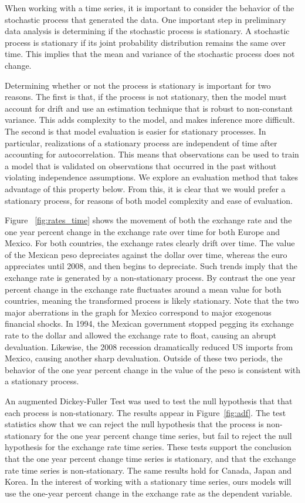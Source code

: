 \documentclass{sig-alternate-05-2015}
\begin{document}
When working with a time series, it is important to consider the behavior of the stochastic process that generated the data. One important step in preliminary data analysis is determining if the stochastic process is stationary. A stochastic process is stationary if its joint probability distribution remains the same over time. This implies that the mean and variance of the stochastic process does not change.
\par{} Determining whether or not the process is stationary is important for two reasons. The first is that, if the process is not stationary, then the model must account for drift and use an estimation technique that is robust to non-constant variance. This adds complexity to the model, and makes inference more difficult. The second is that model evaluation is easier for stationary processes. In particular, realizations of a stationary process are independent of time after accounting for autocorrelation. This means that observations can be used to train a model that is validated on observations that occurred in the past without violating independence assumptions. We explore an evaluation method that takes advantage of this property below. From this, it is clear that we would prefer a stationary process, for reasons of both model complexity and ease of evaluation.
\par{} Figure ~\ref{fig:rates_time} shows the movement of both the exchange rate and the one year percent change in the exchange rate over time for both Europe and Mexico. For both countries, the exchange rates clearly drift over time. The value of the Mexican peso depreciates against the dollar over time, whereas the euro appreciates until 2008, and then begins to depreciate. Such trends imply that the exchange rate is generated by a non-stationary process. By contrast the one year percent change in the exchange rate fluctuates around a mean value for both countries, meaning the transformed process is likely stationary. Note that the two major aberrations in the graph for Mexico correspond to major exogenous financial shocks. In 1994, the Mexican government stopped pegging its exchange rate to the dollar and allowed the exchange rate to float, causing an abrupt devaluation. Likewise, the 2008 recession dramatically reduced US imports from Mexico, causing another sharp devaluation. Outside of these two periods, the behavior of the one year percent change in the value of the peso is consistent with a stationary process.
\par{} An augmented Dickey-Fuller Test was used to test the null hypothesis that that each process is non-stationary. The results appear in Figure~\ref{fig:adf}. The test statistics show that we can reject the null hypothesis that the process is non-stationary for the one year percent change time series, but fail to reject the null hypothesis for the exchange rate time series. These tests support the conclusion that the one year percent change time series is stationary, and that the exchange rate time series is non-stationary. The same results hold for Canada, Japan and Korea. In the interest of working with a stationary time series, ours models will use the one-year percent change in the exchange rate as the dependent variable.
\end{document}
